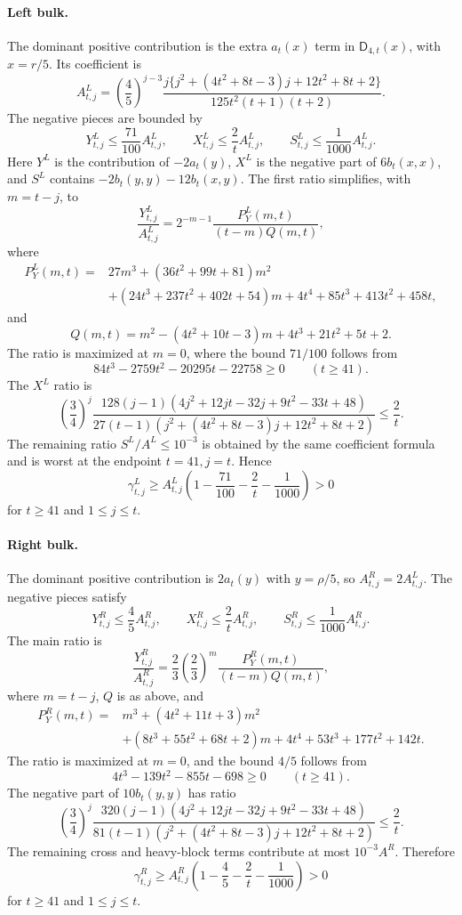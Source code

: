 \documentclass[11pt]{article}
\theoremstyle{definition}
\begin{document}
\paragraph{Left bulk.}
The dominant positive contribution is the extra $a_t(x)$ term in
$\mathsf D_{4,t}(x)$, with $x=r/5$.  Its coefficient is
\[
A^L_{t,j}
=
\left(\frac45\right)^{j-3}
\frac{j\{j^2+(4t^2+8t-3)j+12t^2+8t+2\}}
{125t^2(t+1)(t+2)}.
\]
The negative pieces are bounded by
\[
  Y^L_{t,j}\le\frac{71}{100}A^L_{t,j},
  \qquad
  X^L_{t,j}\le\frac2tA^L_{t,j},
  \qquad
  S^L_{t,j}\le\frac1{1000}A^L_{t,j}.
\]
Here $Y^L$ is the contribution of $-2a_t(y)$, $X^L$ is the negative part of
$6b_t(x,x)$, and $S^L$ contains $-2b_t(y,y)-12b_t(x,y)$.  The first ratio
simplifies, with $m=t-j$, to
\[
\frac{Y^L_{t,j}}{A^L_{t,j}}
=2^{-m-1}\frac{P^L_Y(m,t)}{(t-m)Q(m,t)},
\]
where
\[
\begin{aligned}
P^L_Y(m,t)={}&27m^3+(36t^2+99t+81)m^2\\
&+(24t^3+237t^2+402t+54)m
+4t^4+85t^3+413t^2+458t,
\end{aligned}
\]
and
\[
Q(m,t)=m^2-(4t^2+10t-3)m+4t^3+21t^2+5t+2.
\]
The ratio is maximized at $m=0$, where the bound $71/100$ follows from
\[
84t^3-2759t^2-20295t-22758\ge0\qquad(t\ge41).
\]
The $X^L$ ratio is
\[
\left(\frac34\right)^j
\frac{128(j-1)(4j^2+12jt-32j+9t^2-33t+48)}
{27(t-1)(j^2+(4t^2+8t-3)j+12t^2+8t+2)}
\le\frac2t.
\]
The remaining ratio $S^L/A^L\le10^{-3}$ is obtained by the same coefficient
formula and is worst at the endpoint $t=41,j=t$.  Hence
\[
\gamma^L_{t,j}\ge A^L_{t,j}\left(1-\frac{71}{100}-\frac2t-\frac1{1000}\right)>0
\]
for $t\ge41$ and $1\le j\le t$.

\paragraph{Right bulk.}
The dominant positive contribution is $2a_t(y)$ with $y=\rho/5$, so
$A^R_{t,j}=2A^L_{t,j}$.  The negative pieces satisfy
\[
  Y^R_{t,j}\le\frac45A^R_{t,j},
  \qquad
  X^R_{t,j}\le\frac2tA^R_{t,j},
  \qquad
  S^R_{t,j}\le\frac1{1000}A^R_{t,j}.
\]
The main ratio is
\[
\frac{Y^R_{t,j}}{A^R_{t,j}}
=\frac23\left(\frac23\right)^m
\frac{P^R_Y(m,t)}{(t-m)Q(m,t)},
\]
where $m=t-j$, $Q$ is as above, and
\[
\begin{aligned}
P^R_Y(m,t)={}&m^3+(4t^2+11t+3)m^2\\
&+(8t^3+55t^2+68t+2)m
+4t^4+53t^3+177t^2+142t.
\end{aligned}
\]
The ratio is maximized at $m=0$, and the bound $4/5$ follows from
\[
4t^3-139t^2-855t-698\ge0\qquad(t\ge41).
\]
The negative part of $10b_t(y,y)$ has ratio
\[
\left(\frac34\right)^j
\frac{320(j-1)(4j^2+12jt-32j+9t^2-33t+48)}
{81(t-1)(j^2+(4t^2+8t-3)j+12t^2+8t+2)}
\le\frac2t.
\]
The remaining cross and heavy-block terms contribute at most $10^{-3}A^R$.
Therefore
\[
\gamma^R_{t,j}\ge A^R_{t,j}\left(1-\frac45-\frac2t-\frac1{1000}\right)>0
\]
for $t\ge41$ and $1\le j\le t$.
\end{document}
